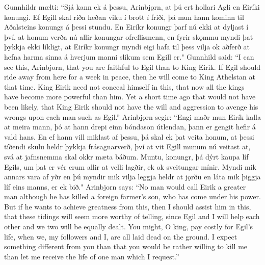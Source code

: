 \begin{paracol}{2}
  Gunnhildr mælti: ``Sjá kann ek á þessu, Arinbjǫrn, at þú ert hollari Agli en Eiríki konungi. Ef Egill skal ríða heðan viku í brott í friði, þá mun hann kominn til Aðalsteins konungs á þessi stundu. En Eiríkr konungr þarf nú ekki at dyljast í því, at honum verða nú allir konungar ofreflismenn, en fyrir skǫmmu myndi þat þykkja ekki líkligt, at Eiríkr konungr myndi eigi hafa til þess vilja ok aðferð at hefna harma sinna á hverjum manni slíkum sem Egill er."
  \switchcolumn
  Gunnhild said: ``I can see this, Arinbjorn, that you are faithful to Egil than to King Eirik. If Egil should ride away from here for a week in peace, then he will come to King Athelstan at that time. King Eirik need not conceal himself in this, that now all the kings have become more powerful than him. Yet a short time ago that would not have been likely, that King Eirik should not have the will and aggression to avenge his wrongs upon each man such as Egil.''
  \switchcolumn*
  Arinbjǫrn segir: ``Engi maðr mun Eirík kalla at meira mann, þó at hann drepi einn bóndason útlendan, þann er gengit hefir á vald hans. En ef hann vill miklast af þessu, þá skal ek þat veita honum, at þessi tíðendi skulu heldr þykkja frásagnarverð, því at vit Egill munum nú veitast at, svá at jafnsnemma skal okkr mæta báðum. Muntu, konungr, þá dýrt kaupa líf Egils, um þat er vér erum allir at velli lagðir, ek ok sveitungar mínir. Myndi mik annars vara af yðr en þú myndir mik vilja leggja heldr at jǫrðu en láta mik þiggja líf eins manns, er ek bið."
  \switchcolumn
  Arinbjorn says: ``No man would call Eirik a greater man although he has killed a foreign farmer's son, who has come under his power. But if he wants to achieve greatness from this, then I should assist him in this, that these tidings will seem more worthy of telling, since Egil and I will help each other and we two will be equally dealt. You might, O king, pay costly for Egil's life, when we, my followers and I, are all laid dead on the ground. I expect something different from you than that you would be rather willing to kill me than let me receive the life of one man which I request.''
\end{paracol}

